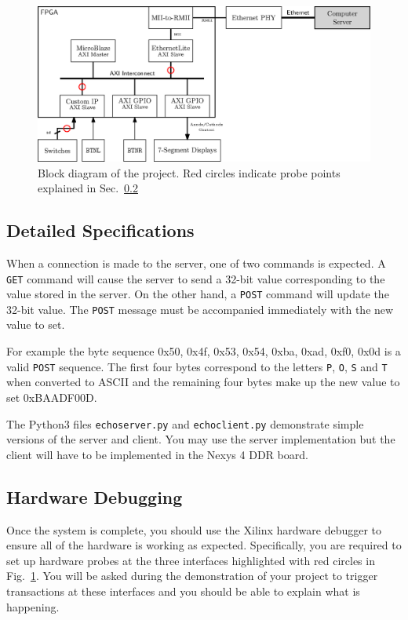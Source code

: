 \documentclass[11pt]{article}
\begin{document}
\begin{figure}[!b]
\centering
\includegraphics[scale=0.855]{diag.eps}
\caption{Block diagram of the project. Red circles indicate probe points explained in Sec.~\ref{sec:wtd:hwdbg}}
\label{fig:blockdiag}
\end{figure}

\subsection{Detailed Specifications}

When a connection is made to the server, one of two commands is expected.
A \verb|GET| command will cause the server to send a 32-bit value corresponding to the value stored in the server.
On the other hand, a \verb|POST| command will update the 32-bit value.
The \verb|POST| message must be accompanied immediately with the new value to set.

For example the byte sequence 0x50, 0x4f, 0x53, 0x54, 0xba, 0xad, 0xf0, 0x0d is a valid \verb|POST| sequence.
The first four bytes correspond to the letters \verb|P|, \verb|O|, \verb|S| and \verb|T| when converted to ASCII and the remaining four bytes make up the new value to set 0xBAADF00D.

The Python3 files \verb|echoserver.py| and \verb|echoclient.py| demonstrate simple versions of the server and client.
You may use the server implementation but the client will have to be implemented in the Nexys 4 DDR board.

\subsection{Hardware Debugging}
\label{sec:wtd:hwdbg}

Once the system is complete, you should use the Xilinx hardware debugger to ensure all of the hardware is working as expected.
Specifically, you are required to set up hardware probes at the three interfaces highlighted with red circles in Fig.~\ref{fig:blockdiag}.
You will be asked during the demonstration of your project to trigger transactions at these interfaces and you should be able to explain what is happening.
\end{document}
